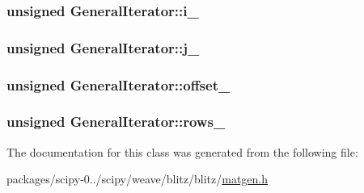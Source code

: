 \subsubsection[{i\+\_\+}]{\setlength{\rightskip}{0pt plus 5cm}unsigned General\+Iterator\+::i\+\_\+\hspace{0.3cm}{\ttfamily [protected]}}\label{classGeneralIterator_a9e22c8f4827e407016ccb40b2103aacf}
\hypertarget{classGeneralIterator_a8ca7c0d4eaa4cee3fcb5aa66b8bbacd8}{}
\subsubsection[{j\+\_\+}]{\setlength{\rightskip}{0pt plus 5cm}unsigned General\+Iterator\+::j\+\_\+\hspace{0.3cm}{\ttfamily [protected]}}\label{classGeneralIterator_a8ca7c0d4eaa4cee3fcb5aa66b8bbacd8}
\hypertarget{classGeneralIterator_a77ddc58d7ce3a669e01df2bb8d8b21c1}{}
\subsubsection[{offset\+\_\+}]{\setlength{\rightskip}{0pt plus 5cm}unsigned General\+Iterator\+::offset\+\_\+\hspace{0.3cm}{\ttfamily [protected]}}\label{classGeneralIterator_a77ddc58d7ce3a669e01df2bb8d8b21c1}
\hypertarget{classGeneralIterator_a37abbe3be14d2039bc533f67b0295c75}{}
\subsubsection[{rows\+\_\+}]{\setlength{\rightskip}{0pt plus 5cm}unsigned General\+Iterator\+::rows\+\_\+\hspace{0.3cm}{\ttfamily [protected]}}\label{classGeneralIterator_a37abbe3be14d2039bc533f67b0295c75}


The documentation for this class was generated from the following file\+:\begin{DoxyCompactItemize}
\item 
packages/scipy-\/0../scipy/weave/blitz/blitz/\hyperlink{matgen_8h}{matgen.\+h}\end{DoxyCompactItemize}
